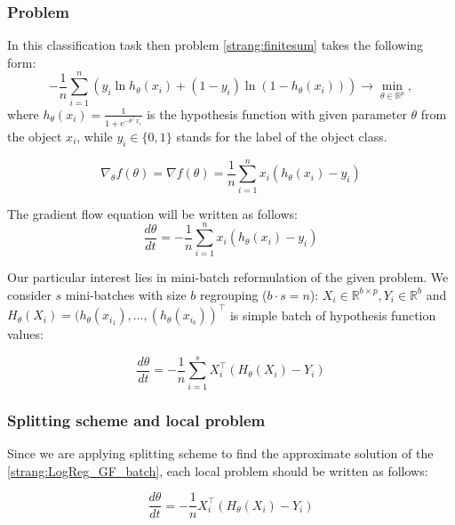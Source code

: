 \documentclass{article}
\begin{document}
\subsubsection{Problem}
In this classification task then problem \eqref{strang:finitesum} takes the following form:
\begin{equation}\label{strang:LogReg}
-\frac{1}{n} \sum_{i=1}^n\left(y_i \ln h_{\theta}(x_i)  + (1-y_i) \ln (1-h_{\theta}(x_i))\right) \to \min_{\theta \in \mathbb{R}^p},
\end{equation}
where $h_\theta(x_i) = \frac{1}{1 + e^{-\theta^\top x_i}}$ is the hypothesis function with given parameter $\theta$ from the object $x_i$, while $ y_i \in \{0,1\}$ stands for the label of the object class.

\begin{equation}\label{strang:LogReg_grad}
\nabla_\theta f(\theta) = \nabla f(\theta) = \frac{1}{n}\sum\limits_{i=1}^n x_i(h_\theta(x_i) - y_i)
\end{equation}

The gradient flow equation will be written as follows:
\begin{equation}\label{strang:LogReg_GF}
\frac{d \theta}{d t} = - \frac{1}{n}\sum\limits_{i=1}^n x_i(h_\theta(x_i) - y_i)
\end{equation}

Our particular interest lies in mini-batch reformulation of the given problem. We consider $s$ mini-batches with size $b$ regrouping ($b \cdot s = n$): $X_i \in \mathbb{R}^{b \times p}, Y_i \in \mathbb{R}^{b}$ and  $H_\theta(X_i) = (h_\theta(x_{i_1}), \ldots, (h_\theta(x_{i_b}))^\top$ is simple batch of hypothesis function values:

\begin{equation}\label{strang:LogReg_GF_batch}
\frac{d \theta}{d t} = - \frac{1}{n}\sum\limits_{i=1}^s X_i^\top(H_\theta(X_i) - Y_i)
\end{equation}

\subsubsection{Splitting scheme and local problem}

Since we are applying splitting scheme to find the approximate solution of the \eqref{strang:LogReg_GF_batch}, each local problem should be written as follows:

\begin{equation}\label{strang:LogReg_GF_local}
\frac{d \theta}{d t} = - \frac{1}{n} X_i^\top(H_\theta(X_i) - Y_i)
\end{equation}
\end{document}
